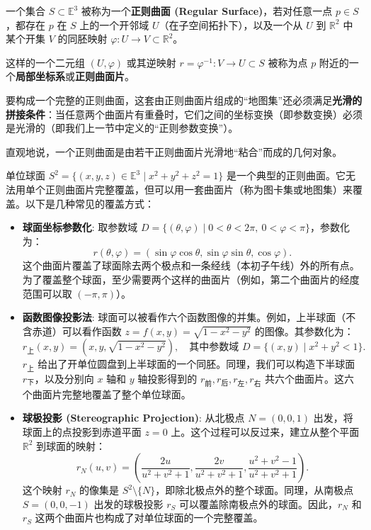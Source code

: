 \documentclass[lang=cn,10pt,thmcnt=section]{elegantbook}
\begin{document}
\begin{definition}[正则曲面]
    一个集合 $S \subset \mathbb{E}^3$ 被称为一个\textbf{正则曲面 (Regular Surface)}，若对任意一点 $p \in S$，都存在 $p$ 在 $S$ 上的一个开邻域 $U$（在子空间拓扑下），以及一个从 $U$ 到 $\mathbb{R}^2$ 中某个开集 $V$ 的同胚映射 $\varphi: U \to V \subset \mathbb{R}^2$。
    
    这样的一个二元组 $(U, \varphi)$ 或其逆映射 $r = \varphi^{-1}: V \to U \subset S$ 被称为点 $p$ 附近的一个\textbf{局部坐标系}或\textbf{正则曲面片}。
    
    要构成一个完整的正则曲面，这套由正则曲面片组成的“地图集”还必须满足\textbf{光滑的拼接条件}：当任意两个曲面片有重叠时，它们之间的坐标变换（即参数变换）必须是光滑的（即我们上一节中定义的“正则参数变换”）。
    
    直观地说，一个正则曲面是由若干正则曲面片光滑地“粘合”而成的几何对象。
\end{definition}
\begin{example}[单位球面]
    单位球面 $S^2 = \{(x, y, z) \in \mathbb{E}^3 \mid x^2 + y^2 + z^2 = 1\}$ 是一个典型的正则曲面。它无法用单个正则曲面片完整覆盖，但可以用一套曲面片（称为图卡集或地图集）来覆盖。以下是几种常见的覆盖方式：
    
    \begin{itemize}
        \item \textbf{球面坐标参数化}: 
        取参数域 $D = \{(\theta, \varphi) \mid 0 < \theta < 2\pi, \ 0 < \varphi < \pi\}$，参数化为：
        \[
        r(\theta, \varphi) = (\sin\varphi \cos\theta, \sin\varphi \sin\theta, \cos\varphi).
        \]
        这个曲面片覆盖了球面除去两个极点和一条经线（本初子午线）外的所有点。为了覆盖整个球面，至少需要两个这样的曲面片（例如，第二个曲面片的经度范围可以取 $(-\pi, \pi)$）。
        
        \item \textbf{函数图像投影法}:
        球面可以被看作六个函数图像的并集。例如，上半球面（不含赤道）可以看作函数 $z = f(x,y) = \sqrt{1 - x^2 - y^2}$ 的图像。其参数化为：
        \[
        r_{\text{上}}(x, y) = \left(x, y, \sqrt{1 - x^2 - y^2}\right), \quad \text{其中参数域 } D = \{(x, y) \mid x^2 + y^2 < 1\}.
        \]
        $r_{\text{上}}$ 给出了开单位圆盘到上半球面的一个同胚。同理，我们可以构造下半球面 $r_{\text{下}}$，以及分别向 $x$ 轴和 $y$ 轴投影得到的 $r_{\text{前}}, r_{\text{后}}, r_{\text{左}}, r_{\text{右}}$ 共六个曲面片。这六个曲面片完整地覆盖了整个单位球面。
        
        \item \textbf{球极投影 (Stereographic Projection)}:
        从北极点 $N=(0,0,1)$ 出发，将球面上的点投影到赤道平面 $z=0$ 上。这个过程可以反过来，建立从整个平面 $\mathbb{R}^2$ 到球面的映射：
        \[
        r_N(u, v) = \left(\frac{2u}{u^2 + v^2 + 1}, \frac{2v}{u^2 + v^2 + 1}, \frac{u^2 + v^2 - 1}{u^2 + v^2 + 1}\right).
        \]
        这个映射 $r_N$ 的像集是 $S^2 \setminus \{N\}$，即除北极点外的整个球面。同理，从南极点 $S=(0,0,-1)$ 出发的球极投影 $r_S$ 可以覆盖除南极点外的球面。因此，$r_N$ 和 $r_S$ 这两个曲面片也构成了对单位球面的一个完整覆盖。
    \end{itemize}
\end{example}
\end{document}
